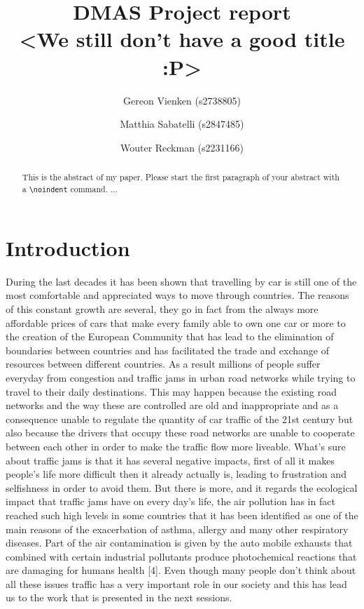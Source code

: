 \documentclass[a4paper,hidelinks]{article}
\title{\textbf{\huge DMAS Project report\\ <We still don't have a good title :P>}%
}
\author{Gereon Vienken (s2738805) \and
    Matthia Sabatelli (s2847485) \and
    Wouter Reckman (s2231166)
}
\date{}
\begin{document}
\ttl
\thispagestyle{empty}

%


\begin{abstract}
\noindent
This is the abstract of my paper. Please start the first paragraph of your abstract with a \verb+\noindent+ command.
...
\end{abstract}


\section{Introduction}
During the last decades it has been shown that travelling by car is still one of the most comfortable and appreciated ways to move through countries. The reasons of this constant growth are several, they go in fact from the always more affordable prices of cars that make every family able to own one car or more to the creation of the European Community that has lead to the elimination of boundaries between countries and has facilitated the trade and exchange of resources between different countries. As a result millions of people suffer everyday from congestion and traffic jams in urban road networks while trying to travel to their daily destinations. This may happen because the existing road networks and the way these are controlled are old and inappropriate and as a consequence unable to regulate the quantity of car traffic of the 21st century but also because the drivers that occupy these road networks are unable to cooperate between each other in order to make the traffic flow more liveable. What's sure about traffic jams is that it has several negative impacts, first of all it makes people's life more difficult then it already actually is, leading to frustration and selfishness in order to avoid them. But there is more, and it regards the ecological impact that traffic jams have on every day's life, the air pollution has in fact reached such high levels in some countries that it has been identified as one of the main reasons of the exacerbation of asthma, allergy and many other respiratory diseases. Part of the air contamination is given by the auto mobile exhausts that combined with certain industrial pollutants produce photochemical reactions that are damaging for humans health [4]. Even though many people don't think about all these issues traffic has a very important role in our society and this has lead us to the work that is presented in the next sessions.             
\end{document}
